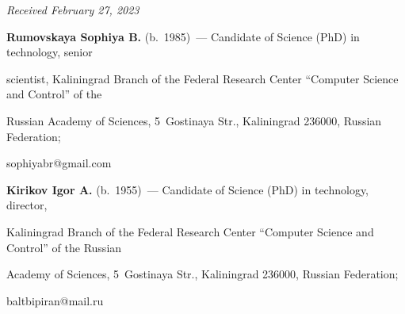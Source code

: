 \vspace*{-6pt}



\hfill{\small\textit{Received February 27, 2023}} 




   

   \Contr

   


   

   \noindent

   \textbf{Rumovskaya Sophiya B.} (b.\ 1985)~--- Candidate of Science (PhD) in technology, senior 

scientist, Kaliningrad Branch of the Federal Research Center ``Computer Science and Control'' of the 

Russian Academy of Sciences, 5~Gostinaya Str., Kaliningrad 236000, Russian Federation; 

\mbox{sophiyabr@gmail.com}

   

   \vspace*{6pt}

   

   \noindent

   \textbf{Kirikov Igor A.} (b.\ 1955)~--- Candidate of Science (PhD) in technology, director, 

Kaliningrad Branch of the Federal Research Center ``Computer Science and Control'' of the Russian 

Academy of Sciences, 5~Gostinaya Str., Kaliningrad 236000, Russian Federation; 

\mbox{baltbipiran@mail.ru}

   

 

\label{end\stat}



\renewcommand{\bibname}{\protect\rm Литература}  

